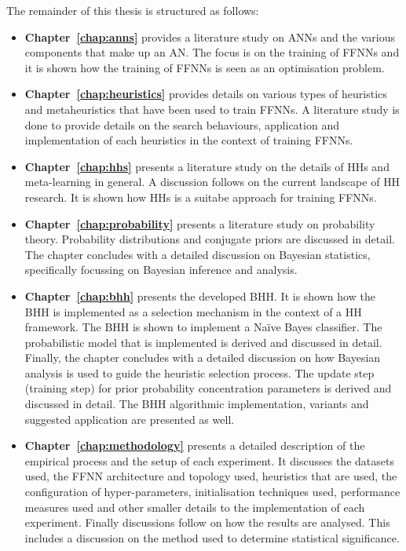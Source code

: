 The remainder of this thesis is structured as follows:

 \begin{itemize}
 	\item
    \textbf{Chapter~\ref{chap:anns}} provides a literature study on \acp{ANN}
    and the various components that make up an \ac{AN}. The focus is on the
    training of \acp{FFNN} and it is shown how the training of \acp{FFNN} is
    seen as an optimisation problem.

	\item
    \textbf{Chapter~\ref{chap:heuristics}} provides details on various types of
    heuristics and metaheuristics that have been used to train \acp{FFNN}. A
    literature study is done to provide details on the search behaviours, application and
    implementation of each heuristics in the context of training \acp{FFNN}.

	\item
    \textbf{Chapter~\ref{chap:hhs}} presents a literature study on the details
    of \acp{HH} and meta-learning in general. A
    discussion follows on the current landscape of \ac{HH} research. It is shown
    how \acp{HH} is a suitabe approach for training \acp{FFNN}.
	
    \item
    \textbf{Chapter~\ref{chap:probability}} presents a literature study on
    probability theory. Probability distributions and
    conjugate priors are discussed in detail. The chapter concludes with a
    detailed discussion on Bayesian statistics, specifically focussing on
    Bayesian inference and analysis.
    
	\item
    \textbf{Chapter~\ref{chap:bhh}} presents the developed \Ac{BHH}. It is shown
    how the \Ac{BHH} is implemented as a selection mechanism in the context of a
    \ac{HH} framework. The \Ac{BHH} is shown to implement a Na\"ive Bayes classifier. The probabilistic model that is
    implemented is derived and discussed in detail. Finally, the chapter
    concludes with a detailed discussion on how Bayesian analysis is used to guide the heuristic selection process.
    The update step (training step) for prior probability concentration
    parameters is derived and discussed in detail. The \Ac{BHH} algorithmic
    implementation, variants and suggested application are presented as well.

	\item
    \textbf{Chapter~\ref{chap:methodology}} presents a detailed description of
    the empirical process and the setup of each experiment. It discusses the
    datasets used, the \ac{FFNN} architecture and topology used, heuristics that
    are used, the configuration of hyper-parameters, initialisation techniques
    used, performance measures used and other smaller details to the
    implementation of each experiment.  Finally discussions follow on how the
    results are analysed. This includes a discussion on the method used to
    determine statistical significance.


\end{itemize}
